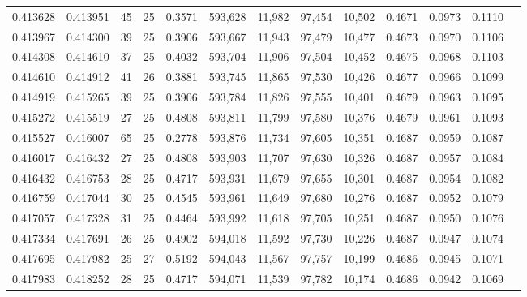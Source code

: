 \begin{tabular}{rrrrrrrrrrrrr}
0.413628 & 0.413951 &    45 &  25 &                                     0.3571 & 593,628 &  11,982 &  97,454 &  10,502 & 0.4671 & 0.0973 & 0.1110 \\
0.413967 & 0.414300 &    39 &  25 &                                     0.3906 & 593,667 &  11,943 &  97,479 &  10,477 & 0.4673 & 0.0970 & 0.1106 \\
0.414308 & 0.414610 &    37 &  25 &                                     0.4032 & 593,704 &  11,906 &  97,504 &  10,452 & 0.4675 & 0.0968 & 0.1103 \\
0.414610 & 0.414912 &    41 &  26 &                                     0.3881 & 593,745 &  11,865 &  97,530 &  10,426 & 0.4677 & 0.0966 & 0.1099 \\
0.414919 & 0.415265 &    39 &  25 &                                     0.3906 & 593,784 &  11,826 &  97,555 &  10,401 & 0.4679 & 0.0963 & 0.1095 \\
0.415272 & 0.415519 &    27 &  25 &                                     0.4808 & 593,811 &  11,799 &  97,580 &  10,376 & 0.4679 & 0.0961 & 0.1093 \\
0.415527 & 0.416007 &    65 &  25 &                                     0.2778 & 593,876 &  11,734 &  97,605 &  10,351 & 0.4687 & 0.0959 & 0.1087 \\
0.416017 & 0.416432 &    27 &  25 &                                     0.4808 & 593,903 &  11,707 &  97,630 &  10,326 & 0.4687 & 0.0957 & 0.1084 \\
0.416432 & 0.416753 &    28 &  25 &                                     0.4717 & 593,931 &  11,679 &  97,655 &  10,301 & 0.4687 & 0.0954 & 0.1082 \\
0.416759 & 0.417044 &    30 &  25 &                                     0.4545 & 593,961 &  11,649 &  97,680 &  10,276 & 0.4687 & 0.0952 & 0.1079 \\
0.417057 & 0.417328 &    31 &  25 &                                     0.4464 & 593,992 &  11,618 &  97,705 &  10,251 & 0.4687 & 0.0950 & 0.1076 \\
0.417334 & 0.417691 &    26 &  25 &                                     0.4902 & 594,018 &  11,592 &  97,730 &  10,226 & 0.4687 & 0.0947 & 0.1074 \\
0.417695 & 0.417982 &    25 &  27 &                                     0.5192 & 594,043 &  11,567 &  97,757 &  10,199 & 0.4686 & 0.0945 & 0.1071 \\
0.417983 & 0.418252 &    28 &  25 &                                     0.4717 & 594,071 &  11,539 &  97,782 &  10,174 & 0.4686 & 0.0942 & 0.1069 \\

\end{tabular}
